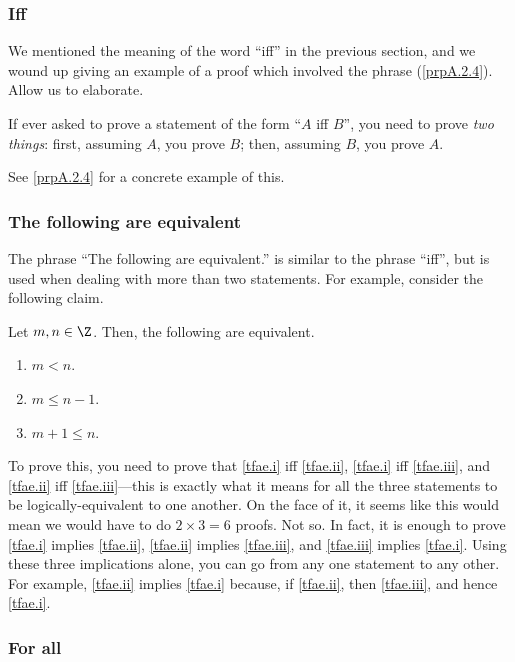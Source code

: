 \subsubsection{Iff}

We mentioned the meaning of the word ``iff'' in the previous section, and we wound up giving an example of a proof which involved the phrase (\cref{prpA.2.4}).  Allow us to elaborate.
\begin{displayquote}
If ever asked to prove a statement of the form ``$A$ iff $B$'', you need to prove \emph{two things}:  first, assuming $A$, you prove $B$; then, assuming $B$, you prove $A$.
\end{displayquote}
See \cref{prpA.2.4} for a concrete example of this.

\subsubsection{The following are equivalent}

The phrase ``The following are equivalent.'' is similar to the phrase ``iff'', but is used when dealing with more than two statements.  For example, consider the following claim.
\begin{displayquote}
Let $m,n\in \Z$.  Then, the following are equivalent.
\begin{enumerate}
\item \label{tfae.i}$m<n$.
\item \label{tfae.ii}$m\leq n-1$.
\item \label{tfae.iii}$m+1\leq n$.
\end{enumerate}
\end{displayquote}
To prove this, you need to prove that \cref{tfae.i} iff \cref{tfae.ii}, \cref{tfae.i} iff \cref{tfae.iii}, and \cref{tfae.ii} iff \cref{tfae.iii}---this is exactly what it means for all the three statements to be logically-equivalent to one another.  On the face of it, it seems like this would mean we would have to do $2\times 3=6$ proofs.  Not so.  In fact, it is enough to prove \cref{tfae.i} implies \cref{tfae.ii}, \cref{tfae.ii} implies \cref{tfae.iii}, and \cref{tfae.iii} implies \cref{tfae.i}.  Using these three implications alone, you can go from any one statement to any other.  For example, \cref{tfae.ii} implies \cref{tfae.i} because, if \cref{tfae.ii}, then \cref{tfae.iii}, and hence \cref{tfae.i}.

\subsubsection{For all\textellipsis}

